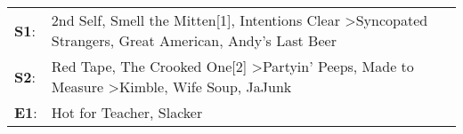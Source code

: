 \begin{supertabular}{p{0.03\textwidth}p{0.92\textwidth}}
 \textbf{S1}:  &                          2nd Self\textsuperscript{}, \enspace Smell the Mitten[1]\textsuperscript{}, \enspace Intentions Clear\textsuperscript{} \textgreater \enspace Syncopated Strangers\textsuperscript{}, \enspace Great American\textsuperscript{}, \enspace Andy's Last Beer\textsuperscript{}  \enspace  \\
 \textbf{S2}:  &  Red Tape\textsuperscript{}, \enspace The Crooked One[2]\textsuperscript{} \textgreater \enspace Partyin' Peeps\textsuperscript{}, \enspace Made to Measure\textsuperscript{} \textgreater \enspace Kimble\textsuperscript{}, \enspace Wife Soup\textsuperscript{}, \enspace JaJunk\textsuperscript{}  \enspace  \\
 \textbf{E1}:  &                                                                                                                                                                                                                                 Hot for Teacher\textsuperscript{}, \enspace Slacker\textsuperscript{}  \enspace  \\
\end{supertabular}
